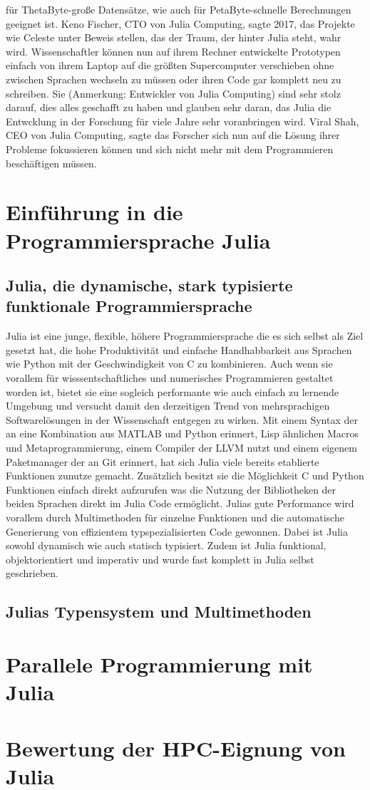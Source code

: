 \documentclass[proseminar,german,utf8]{zihpub}
\begin{document}
für ThetaByte-große Datensätze, wie auch für PetaByte-schnelle Berechnungen geeignet ist. Keno Fischer, CTO von Julia Computing, sagte 2017, das Projekte wie Celeste unter Beweis stellen, das der Traum, der hinter Julia steht, wahr wird. Wissenschaftler können nun auf ihrem Rechner entwickelte Prototypen einfach von ihrem Laptop auf die größten Supercomputer verschieben ohne zwischen Sprachen wechseln zu müssen oder ihren Code gar komplett neu zu schreiben. Sie (Anmerkung: Entwickler von Julia Computing) sind sehr stolz darauf, dies alles geschafft zu haben und glauben sehr daran, das Julia die Entwcklung in der Forschung für viele Jahre sehr voranbringen wird. Viral Shah, CEO von Julia Computing, sagte das Forscher sich nun auf die Lösung ihrer Probleme fokussieren können und sich nicht mehr mit dem Programmieren beschäftigen müssen.

\section{Einführung in die Programmiersprache Julia}
\subsection{Julia, die dynamische, stark typisierte funktionale Programmiersprache}
Julia ist eine junge, flexible, höhere Programmiersprache die es sich selbst als Ziel gesetzt hat, die hohe Produktivität und einfache Handhabbarkeit aus Sprachen wie Python mit der Geschwindigkeit von C zu kombinieren. Auch wenn sie vorallem für wisssentschaftliches und numerisches Programmieren gestaltet worden ist, bietet sie eine sogleich performante wie auch einfach zu lernende Umgebung und versucht damit den derzeitigen Trend von mehrsprachigen Softwarelösungen in der Wissenschaft entgegen zu wirken. Mit einem Syntax der an eine Kombination aus MATLAB und Python erinnert, Lisp ähnlichen Macros und Metaprogrammierung, einem Compiler der LLVM nutzt und einem eigenem Paketmanager der an Git erinnert, hat sich Julia viele bereits etablierte Funktionen zunutze gemacht. Zusätzlich besitzt sie die Möglichkeit C und Python Funktionen einfach direkt aufzurufen was die Nutzung der Bibliotheken der beiden Sprachen direkt im Julia Code ermöglicht. Julias gute Performance wird vorallem durch Multimethoden für einzelne Funktionen und die automatische Generierung von effizientem typspezialisierten Code gewonnen. Dabei ist Julia sowohl dynamisch wie auch statisch typisiert. Zudem ist Julia funktional, objektorientiert und imperativ und wurde fast komplett in Julia selbst geschrieben.
\subsection{Julias Typensystem und Multimethoden}

\section{Parallele Programmierung mit Julia}
\section{Bewertung der HPC-Eignung von Julia}
\end{document}
